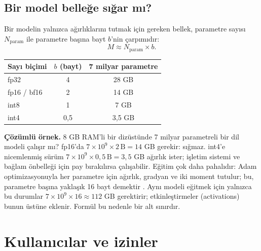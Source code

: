 \documentclass[11pt,a4paper]{article}
\begin{document}
\subsection{Bir model belleğe sığar mı?}
Bir modelin yalnızca ağırlıklarını tutmak için gereken bellek, parametre sayısı $N_{\text{param}}$ ile parametre başına bayt $b$'nin çarpımıdır:
\begin{equation}
M \approx N_{\text{param}} \times b .
\end{equation}
\begin{center}
\begin{tabular}{lcc}
\toprule
\textbf{Sayı biçimi} & \textbf{$b$ (bayt)} & \textbf{7 milyar parametre} \\
\midrule
fp32 & 4 & 28 GB \\
fp16 / bf16 & 2 & 14 GB \\
int8 & 1 & 7 GB \\
int4 & 0,5 & 3,5 GB \\
\bottomrule
\end{tabular}
\end{center}
\begin{kutu}
\textbf{Çözümlü örnek.} 8 GB RAM'li bir dizüstünde 7 milyar parametreli bir dil modeli çalışır mı? fp16'da $7\times10^{9}\times 2\,\text{B} = 14$ GB gerekir: sığmaz. int4'e nicemlenmiş sürüm $7\times10^{9}\times 0{,}5\,\text{B} = 3{,}5$ GB ağırlık ister; işletim sistemi ve bağlam önbelleği için pay bırakılırsa çalışabilir. Eğitim çok daha pahalıdır: Adam optimizasyonuyla her parametre için ağırlık, gradyan ve iki moment tutulur; bu, parametre başına yaklaşık 16 bayt demektir \cite{zero}. Aynı modeli eğitmek için yalnızca bu durumlar $7\times10^{9}\times16 \approx 112$ GB gerektirir; etkinleştirmeler (activations) bunun üstüne eklenir. Formül bu nedenle bir alt sınırdır.
\end{kutu}

\section{Kullanıcılar ve izinler}
\end{document}
